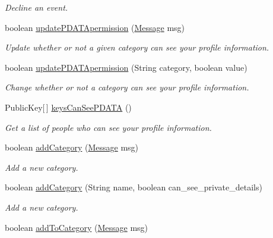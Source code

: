 \begin{DoxyCompactItemize}
\begin{DoxyCompactList}\small\item\em Decline an event. \end{DoxyCompactList}\item 
boolean \hyperlink{classballmerpeak_1_1turtlenet_1_1server_1_1Database_ae65d70bab4c0fba8f0c941487385c8c9}{update\-P\-D\-A\-T\-Apermission} (\hyperlink{classballmerpeak_1_1turtlenet_1_1shared_1_1Message}{Message} msg)
\begin{DoxyCompactList}\small\item\em Update whether or not a given category can see your profile information. \end{DoxyCompactList}\item 
boolean \hyperlink{classballmerpeak_1_1turtlenet_1_1server_1_1Database_aed151a8daa6202838bdc8b949d6de05c}{update\-P\-D\-A\-T\-Apermission} (String category, boolean value)
\begin{DoxyCompactList}\small\item\em Change whether or not a category can see your profile information. \end{DoxyCompactList}\item 
Public\-Key\mbox{[}$\,$\mbox{]} \hyperlink{classballmerpeak_1_1turtlenet_1_1server_1_1Database_acd908d7244665e90b2c852d2bd4d24d8}{keys\-Can\-See\-P\-D\-A\-T\-A} ()
\begin{DoxyCompactList}\small\item\em Get a list of people who can see your profile information. \end{DoxyCompactList}\item 
boolean \hyperlink{classballmerpeak_1_1turtlenet_1_1server_1_1Database_a60f429af2120947b9a6cc06617bb1bea}{add\-Category} (\hyperlink{classballmerpeak_1_1turtlenet_1_1shared_1_1Message}{Message} msg)
\begin{DoxyCompactList}\small\item\em Add a new category. \end{DoxyCompactList}\item 
boolean \hyperlink{classballmerpeak_1_1turtlenet_1_1server_1_1Database_a543175382e7c3baf70b684a79c5046d8}{add\-Category} (String name, boolean can\-\_\-see\-\_\-private\-\_\-details)
\begin{DoxyCompactList}\small\item\em Add a new category. \end{DoxyCompactList}\item 
boolean \hyperlink{classballmerpeak_1_1turtlenet_1_1server_1_1Database_aca5e259e29216730354cf97b87f1a070}{add\-To\-Category} (\hyperlink{classballmerpeak_1_1turtlenet_1_1shared_1_1Message}{Message} msg)

\end{DoxyCompactItemize}
